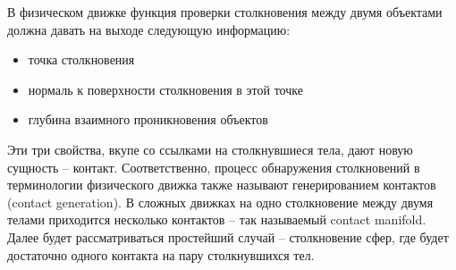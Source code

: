 В физическом движке функция проверки столкновения
между двумя объектами должна давать на выходе следующую
информацию:
\begin{itemize}
  \item точка столкновения
  \item нормаль к поверхности столкновения в этой точке
  \item глубина взаимного проникновения объектов
\end{itemize}

Эти три свойства, вкупе со ссылками на столкнувшиеся
тела, дают новую сущность – контакт. Соответственно,
процесс обнаружения столкновений в терминологии
физического движка также называют генерированием
контактов (contact generation). В сложных движках на одно
столкновение между двумя телами приходится несколько
контактов – так называемый contact manifold. Далее будет 
рассматриваться простейший случай – столкновение сфер, где будет
достаточно одного контакта на пару столкнувшихся тел.

